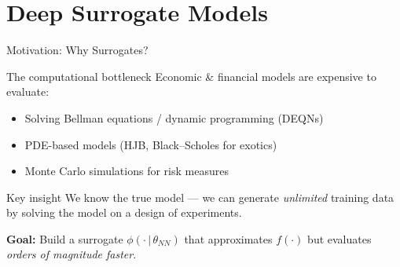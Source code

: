 \documentclass[aspectratio=169,11pt]{beamer}
\newcommand{\emphc}[1]{\textcolor{harvardcrimson}{#1}}
\begin{document}
\section{Deep Surrogate Models}

\begin{frame}{Motivation: Why Surrogates?}
\begin{block}{The computational bottleneck}
Economic \& financial models are expensive to evaluate:
\begin{itemize}
  \item Solving Bellman equations / dynamic programming (DEQNs)
  \item PDE-based models (HJB, Black--Scholes for exotics)
  \item Monte Carlo simulations for risk measures
\end{itemize}
\end{block}

\vspace{0.3cm}
\begin{alertblock}{Key insight}
\emphc{We know the true model} --- we can generate \emph{unlimited} training data by solving the model on a design of experiments.
\end{alertblock}

\vspace{0.3cm}
\textbf{Goal:} Build a \emphc{surrogate} $\phi(\cdot\,|\,\theta_{NN})$ that approximates $f(\cdot)$ but evaluates \emph{orders of magnitude faster}.
\end{frame}
\end{document}
